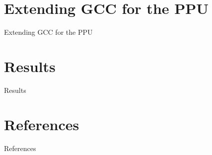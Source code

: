 \documentclass[10pt,aspectratio=169]{beamer}
\begin{document}
\section{Extending GCC for the PPU}
\begin{frame}{Extending GCC for the PPU}
 \begin{center}
 \end{center}
\end{frame}

\section{Results}
\begin{frame}{Results}
 \begin{center}
 \end{center}
\end{frame}



\section{References}
\begin{frame}{References}
    \printbibliography
\end{frame}
\end{document}
